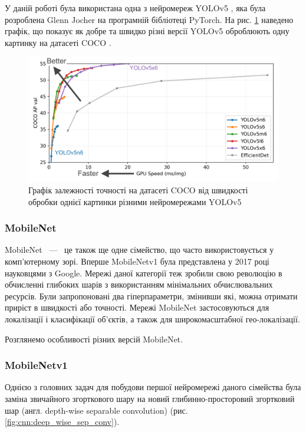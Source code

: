 У даній роботі була використана одна з нейромереж YOLOv5 \cite{website:yolov5_pytorch}, яка була
розроблена Glenn Jocher на програмній бібліотеці PyTorch. На рис. \ref{fig:yolov5:graph}
наведено графік, що показує як добре та швидко різні версії YOLOv5 оброблюють одну картинку
на датасеті COCO \cite{website:coco_dataset}.

\begin{figure}[H]
    \includegraphics[width=0.5\linewidth]{images/cnn_yolo3}
    \centering
    \caption{Графік залежності точності на датасеті COCO від швидкості обробки однієї
        картинки різними нейромережами YOLOv5 \cite{website:yolov5_pytorch}
        \label{fig:yolov5:graph}
    }
\end{figure}

\subsubsection{MobileNet}

MobileNet ~---~ це також ще одне сімейство, що часто використовується у комп'ютерному зорі.
Вперше MobileNetv1 \cite{bib:mobilenet:v1} була представлена у 2017 році науковцями з Google.
Мережі даної категорії теж зробили свою революцію в обчисленні глибоких шарів з
використанням мінімальних обчислювальних ресурсів. Були запропоновані два гіперпараметри,
змінивши які, можна отримати приріст в швидкості або точності. Мережі MobileNet
застосовуються для локалізації і класифікації об'єктів, а також для широкомасштабної
гео-локалізації.

Розглянемо особливості різних версій MobileNet.

\subsubsection{MobileNetv1}
Однією з головних задач для побудови першої нейромережі даного сімейства була заміна
звичайного згорткового шару на новий глибинно-просторовий згортковий шар
(англ. depth-wise separable convolution) (рис. \ref{fig:cnn:deep_wise_sep_conv}).

